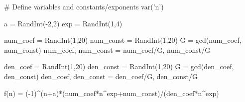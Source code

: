 \begin{sagesilent}
# Define variables and constants/exponents
var('n')

a = RandInt(-2,2)
exp = RandInt(1,4)

num_coef  = RandInt(1,20)
num_const = RandInt(1,20)
G = gcd(num_coef, num_const)
num_coef, num_const = num_coef/G, num_const/G

den_coef  = RandInt(1,20)
den_const = RandInt(1,20)
G = gcd(den_coef, den_const)
den_coef, den_const = den_coef/G, den_const/G

f(n) = (-1)^(n+a)*(num_coef*n^exp+num_const)/(den_coef*n^exp)

\end{sagesilent}

